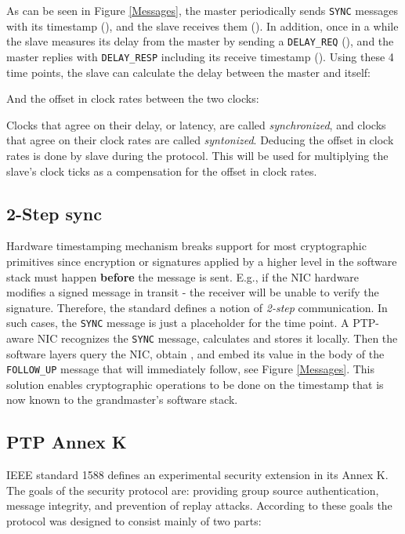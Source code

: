 \documentclass[11pt]{article}
\begin{document}
As can be seen in Figure \ref{Messages}, the master periodically sends \texttt{SYNC} messages with its timestamp (), and the slave receives them (). In addition, once in a while the slave measures its delay from the master by sending a \texttt{DELAY_REQ} (), and the master replies with \texttt{DELAY_RESP} including its receive timestamp (). Using these 4 time points, the slave can calculate the delay between the master and itself:



And the offset in clock rates between the two clocks:



Clocks that agree on their delay, or latency, are called \emph{synchronized}, and clocks that agree on their clock rates are called \emph{syntonized}. Deducing the offset in clock rates is done by slave during the protocol. This will be used for multiplying the slave's clock ticks as a compensation for the offset in clock rates.



\subsection{2-Step sync}\label{2step}

Hardware timestamping mechanism breaks support for most cryptographic primitives since encryption or signatures applied by a higher level in the software stack must happen \textbf{before} the message is sent. E.g., if the NIC hardware modifies a signed message in transit - the receiver will be unable to verify the signature. Therefore, the standard defines a notion of \emph{2-step} communication. In such cases, the \texttt{SYNC} message is just a placeholder for the  time point. A PTP-aware NIC recognizes the \texttt{SYNC} message, calculates  and stores it locally. Then the software layers query the NIC, obtain , and embed its value in the body of the \texttt{FOLLOW_UP} message that will immediately follow, see Figure \ref{Messages}. This solution enables cryptographic operations to be done on the timestamp that is now known to the grandmaster's software stack.



\subsection{PTP Annex K}\label{appendix}

IEEE standard 1588 defines an experimental security extension in its Annex K. The goals of the security protocol are: providing group source authentication, message integrity, and prevention of replay attacks. According to these goals the protocol was designed to consist mainly of two parts:
\end{document}
